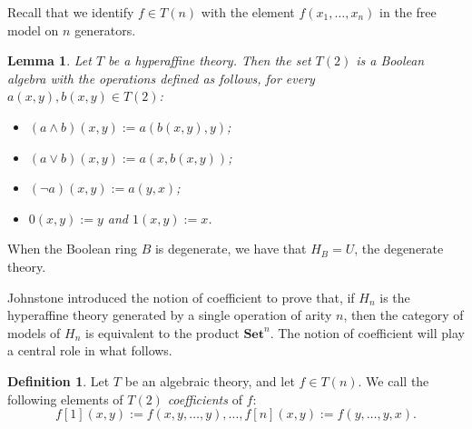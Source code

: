 \documentclass{amsart}
\numberwithin{equation}{section}
\theoremstyle{plain}
\newtheorem{lemma}[theorem]{Lemma}
\theoremstyle{definition}
\newtheorem{definition}[theorem]{Definition}
\begin{document}
Recall that we identify $f \in T(n)$ with the element $f(x_1, \ldots, x_n)$ in the free model on $n$ generators. 

\begin{lemma} 
  \cite[Proposition 4.4]{G24}
  \label{lem:hyper-bool}
    Let $T$ be a hyperaffine theory.  
    Then the set $T(2)$ is a Boolean algebra with the operations defined as follows, for every $a(x,y), b(x,y) \in T(2)$:
    \begin{itemize}
        \item $(a \land b)(x,y):=a(b(x,y),y)$; 
        \item $(a \lor b)(x,y):=a(x,b(x,y))$; 
        \item $(\lnot a)(x,y):=a(y,x)$; 
        \item $0(x,y):=y$ and $1(x,y):=x$. 
    \end{itemize}
\end{lemma}

When the Boolean ring $B$ is degenerate, we have that $H_B=U$, the degenerate theory. 

Johnstone \cite[p.~461]{J90} introduced the notion of coefficient to prove that, if $H_n$ is the hyperaffine theory generated by a single operation of arity $n$, then the category of models of $H_n$ is equivalent to the product $\mathbf{Set}^n$.  
The notion of coefficient will play a central role in what follows. 

\begin{definition}
  \label{def:coord}
Let $T$ be an algebraic theory, and let $f \in T(n)$. 
We call the following elements of $T(2)$ \emph{coefficients} of $f$: 
\begin{equation*}
  f[1](x,y):=f(x,y,\ldots,y), \ldots, f[n](x,y):=f(y,\ldots,y,x)\text{.}
\end{equation*}
\end{definition}
\end{document}
